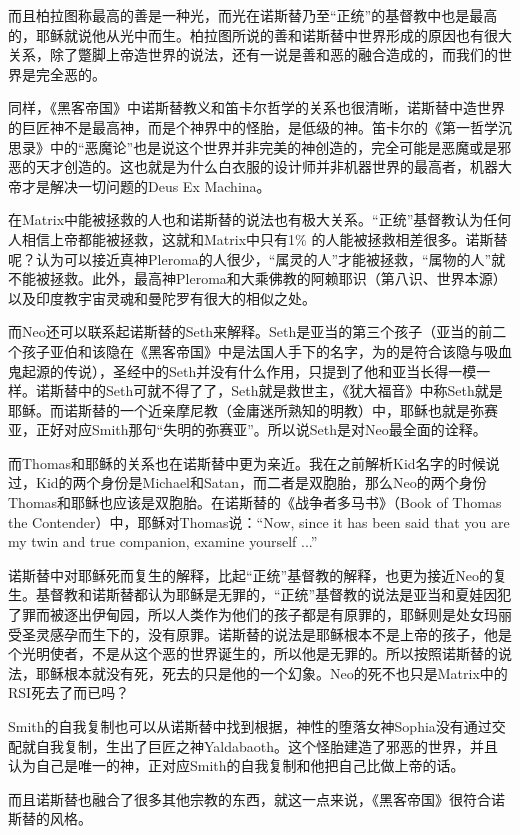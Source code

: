 \documentclass[UTF8]{ctexart}
\begin{document}
而且柏拉图称最高的善是一种光，而光在诺斯替乃至“正统”的基督教中也是最高的，耶稣就说他从光中而生。柏拉图所说的善和诺斯替中世界形成的原因也有很大关系，除了蹩脚上帝造世界的说法，还有一说是善和恶的融合造成的，而我们的世界是完全恶的。

同样，《黑客帝国》中诺斯替教义和笛卡尔哲学的关系也很清晰，诺斯替中造世界的巨匠神不是最高神，而是个神界中的怪胎，是低级的神。笛卡尔的《第一哲学沉思录》中的“恶魔论”也是说这个世界并非完美的神创造的，完全可能是恶魔或是邪恶的天才创造的。这也就是为什么白衣服的设计师并非机器世界的最高者，机器大帝才是解决一切问题的Deus Ex Machina。

在Matrix中能被拯救的人也和诺斯替的说法也有极大关系。“正统”基督教认为任何人相信上帝都能被拯救，这就和Matrix中只有1\% 的人能被拯救相差很多。诺斯替呢？认为可以接近真神Pleroma的人很少，“属灵的人”才能被拯救，“属物的人”就不能被拯救。此外，最高神Pleroma和大乘佛教的阿赖耶识（第八识、世界本源）以及印度教宇宙灵魂和曼陀罗有很大的相似之处。

而Neo还可以联系起诺斯替的Seth来解释。Seth是亚当的第三个孩子（亚当的前二个孩子亚伯和该隐在《黑客帝国》中是法国人手下的名字，为的是符合该隐与吸血鬼起源的传说），圣经中的Seth并没有什么作用，只提到了他和亚当长得一模一样。诺斯替中的Seth可就不得了了，Seth就是救世主，《犹大福音》中称Seth就是耶稣。而诺斯替的一个近亲摩尼教（金庸迷所熟知的明教）中，耶稣也就是弥赛亚，正好对应Smith那句“失明的弥赛亚”。所以说Seth是对Neo最全面的诠释。

而Thomas和耶稣的关系也在诺斯替中更为亲近。我在之前解析Kid名字的时候说过，Kid的两个身份是Michael和Satan，而二者是双胞胎，那么Neo的两个身份Thomas和耶稣也应该是双胞胎。在诺斯替的《战争者多马书》（Book of Thomas the Contender）中，耶稣对Thomas说：“Now, since it has been said that you are my twin and true companion, examine yourself ...”

诺斯替中对耶稣死而复生的解释，比起“正统”基督教的解释，也更为接近Neo的复生。基督教和诺斯替都认为耶稣是无罪的，“正统”基督教的说法是亚当和夏娃因犯了罪而被逐出伊甸园，所以人类作为他们的孩子都是有原罪的，耶稣则是处女玛丽受圣灵感孕而生下的，没有原罪。诺斯替的说法是耶稣根本不是上帝的孩子，他是个光明使者，不是从这个恶的世界诞生的，所以他是无罪的。所以按照诺斯替的说法，耶稣根本就没有死，死去的只是他的一个幻象。Neo的死不也只是Matrix中的RSI死去了而已吗？

Smith的自我复制也可以从诺斯替中找到根据，神性的堕落女神Sophia没有通过交配就自我复制，生出了巨匠之神Yaldabaoth。这个怪胎建造了邪恶的世界，并且认为自己是唯一的神，正对应Smith的自我复制和他把自己比做上帝的话。

而且诺斯替也融合了很多其他宗教的东西，就这一点来说，《黑客帝国》很符合诺斯替的风格。
\end{document}
